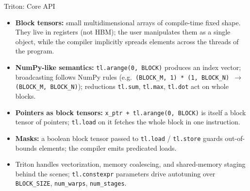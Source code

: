 \begin{frame}{Triton: Core API}
  \vspace{0.3em}
  {\small
  \begin{itemize}
    \item \textbf{Block tensors:} small multidimensional arrays of compile-time fixed shape. They live in registers (not HBM); the user manipulates them as a single object, while the compiler implicitly spreads elements across the threads of the program.
    \item \textbf{NumPy-like semantics:} \texttt{tl.arange(0, BLOCK)} produces an index vector; broadcasting follows NumPy rules (e.g.\ \texttt{(BLOCK\_M, 1) * (1, BLOCK\_N) $\to$ (BLOCK\_M, BLOCK\_N)}); reductions \texttt{tl.sum}, \texttt{tl.max}, \texttt{tl.dot} act on whole blocks.
    \item \textbf{Pointers as block tensors:} \texttt{x\_ptr + tl.arange(0, BLOCK)} is itself a block tensor of pointers; \texttt{tl.load} on it fetches the whole block in one instruction.
    \item \textbf{Masks:} a boolean block tensor passed to \texttt{tl.load} / \texttt{tl.store} guards out-of-bounds elements; the compiler emits predicated loads.
    \item Triton handles vectorization, memory coalescing, and shared-memory staging behind the scenes; \texttt{tl.constexpr} parameters drive autotuning over \texttt{BLOCK\_SIZE}, \texttt{num\_warps}, \texttt{num\_stages}.
  \end{itemize}
  }
\end{frame}

